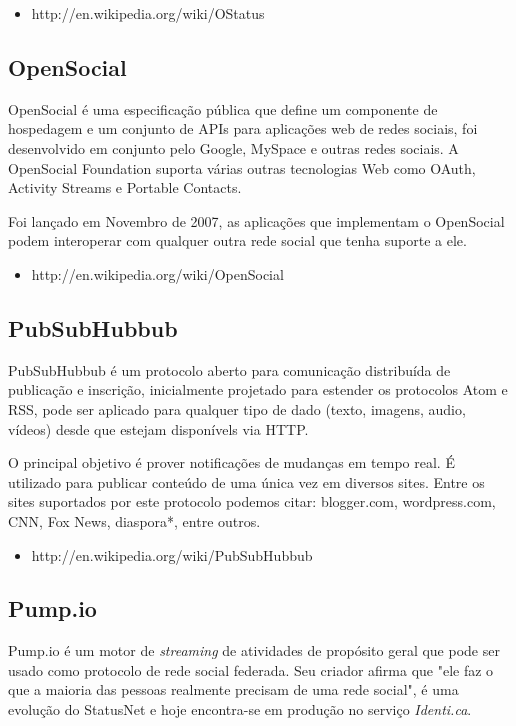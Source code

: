 \documentclass[12pt]{article}
\begin{document}
\begin{itemize}
  \item http://en.wikipedia.org/wiki/OStatus
\end{itemize}

\subsection{OpenSocial}

OpenSocial é uma especificação pública que define um componente de hospedagem
e um conjunto de APIs para aplicações web de redes sociais, foi desenvolvido
em conjunto pelo Google, MySpace e outras redes sociais. A OpenSocial
Foundation suporta várias outras tecnologias Web como OAuth, Activity Streams
e Portable Contacts.

Foi lançado em Novembro de 2007, as aplicações que implementam o OpenSocial
podem interoperar com qualquer outra rede social que tenha suporte a ele.

\begin{itemize}
  \item http://en.wikipedia.org/wiki/OpenSocial
\end{itemize}

\subsection{PubSubHubbub}

PubSubHubbub é um protocolo aberto para comunicação distribuída de publicação
e inscrição, inicialmente projetado para estender os protocolos Atom e RSS,
pode ser aplicado para qualquer tipo de dado (texto, imagens,
audio, vídeos) desde que estejam disponívels via HTTP.

O principal objetivo é prover notificações de mudanças em tempo real. É
utilizado para publicar conteúdo de uma única vez em diversos sites. Entre os
sites suportados por este protocolo podemos citar: blogger.com, wordpress.com,
CNN, Fox News, diaspora*, entre outros.

\begin{itemize}
  \item http://en.wikipedia.org/wiki/PubSubHubbub
\end{itemize}

\subsection{Pump.io}

Pump.io é um motor de {\it streaming} de atividades de propósito geral que
pode ser usado como protocolo de rede social federada. Seu criador afirma que
"ele faz o que a maioria das pessoas realmente precisam de uma rede social", é
uma evolução do StatusNet e hoje encontra-se em produção no serviço {\it
Identi.ca}.
\end{document}
